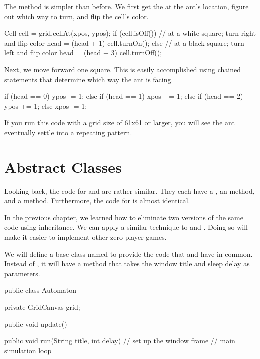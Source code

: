 The  method is simpler than before.
We first get the  at the ant's location, figure out which way to turn, and flip the cell's color.

\begin{code}
Cell cell = grid.cellAt(xpos, ypos);
if (cell.isOff()) {
    // at a white square; turn right and flip color
    head = (head + 1) %
    cell.turnOn();
} else {
    // at a black square; turn left and flip color
    head = (head + 3) %
    cell.turnOff();
}
\end{code}

Next, we move forward one square.
This is easily accomplished using chained  statements that determine which way the ant is facing.

\begin{code}
if (head == 0) {
    ypos -= 1;
} else if (head == 1) {
    xpos += 1;
} else if (head == 2) {
    ypos += 1;
} else {
    xpos -= 1;
}
\end{code}

If you run this code with a grid size of 61x61 or larger, you will see the ant eventually settle into a repeating pattern.


\section{Abstract Classes}

Looking back, the code for  and  are rather similar.
They each have a , an  method, and a  method.
Furthermore, the code for  is almost identical.

In the previous chapter, we learned how to eliminate two versions of the same code using inheritance.
We can apply a similar technique to  and .
Doing so will make it easier to implement other zero-player games.

We will define a base class named  to provide the code that  and  have in common.
Instead of , it will have a  method that takes the window title and sleep delay as parameters.

\begin{code}
public class Automaton {
    private GridCanvas grid;

    public void update() {
    }

    public void run(String title, int delay) {
        // set up the window frame
        // main simulation loop
    }
}
\end{code}

